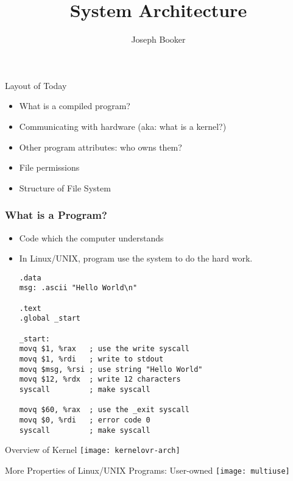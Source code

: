 \documentclass[xcolor={usenames,x11names}]{beamer}
\title[What is UNIX?]{System Architecture}
\author{Joseph Booker}
\institute[UToledo]{Department of Physics and Astronomy \\ University of Toledo}
\begin{document}
\frame{\titlepage}

\begin{frame}{Layout of Today}
        \begin{itemize}
                \item What is a compiled program?
                \pause\item Communicating with hardware (aka: what is a kernel?)
                \pause\item Other program attributes: who owns them?
                \pause\item File permissions
                \pause\item Structure of File System
        \end{itemize}
\end{frame}

\begin{frame}[fragile]
\frametitle{What is a Program?}
 \begin{itemize}
  \item Code which the computer understands
  \pause\item In Linux/UNIX, program use the system to do the hard work.\begin{lstlisting}[language={[x86masm]Assembler},basicstyle=\tiny]
.data
msg: .ascii "Hello World\n"

.text
.global _start

_start:
movq $1, %rax   ; use the write syscall
movq $1, %rdi   ; write to stdout
movq $msg, %rsi ; use string "Hello World"
movq $12, %rdx  ; write 12 characters
syscall         ; make syscall

movq $60, %rax  ; use the _exit syscall
movq $0, %rdi   ; error code 0
syscall         ; make syscall
\end{lstlisting}
 \end{itemize}
\end{frame}

\begin{frame}{Overview of Kernel}\centering
 \texttt{[image: kernelovr-arch]}
\end{frame}

\begin{frame}{More Properties of Linux/UNIX Programs: User-owned}\centering
 \texttt{[image: multiuse]}
\end{frame}
\end{document}
